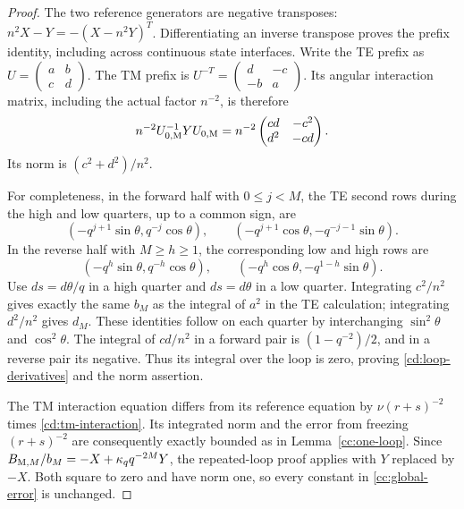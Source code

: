 \begin{proof}
The two reference generators are negative transposes:
$n^2X-Y=-(X-n^2Y)^T$. Differentiating an inverse transpose proves
the prefix identity, including across continuous state interfaces.
Write the TE prefix as
$U=\left(\begin{smallmatrix}a&b\\c&d\end{smallmatrix}\right)$.
The TM prefix is
$U^{-T}=\left(\begin{smallmatrix}d&-c\\-b&a\end{smallmatrix}\right)$.
Its angular interaction matrix, including the actual factor $n^{-2}$,
is therefore
\begin{equation}\label{cd:tm-interaction}
 n^{-2}U_{0,{\rm M}}^{-1}YU_{0,{\rm M}}
   =n^{-2}\begin{pmatrix}cd&-c^2\\d^2&-cd\end{pmatrix}.
\end{equation}
Its norm is $(c^2+d^2)/n^2$.

For completeness, in the forward half with $0\leq j<M$, the TE
second rows during the high and low quarters, up to a common sign, are
\[
 (-q^{j+1}\sin\theta,q^{-j}\cos\theta),\qquad
 (-q^{j+1}\cos\theta,-q^{-j-1}\sin\theta).
\]
In the reverse half with $M\geq h\geq1$, the corresponding low
and high rows are
\[
 (-q^h\sin\theta,q^{-h}\cos\theta),\qquad
 (-q^h\cos\theta,-q^{1-h}\sin\theta).
\]
Use $ds=d\theta/q$ in a high quarter and $ds=d\theta$ in a
low quarter. Integrating $c^2/n^2$ gives exactly the same
$b_M$ as the integral of $a^2$ in the TE calculation; integrating
$d^2/n^2$ gives $d_M$. These identities follow on each quarter
by interchanging $\sin^2\theta$ and $\cos^2\theta$.
The integral of $cd/n^2$ in a forward pair is
$(1-q^{-2})/2$, and in a reverse pair its negative.
Thus its integral over the loop is zero, proving
\eqref{cd:loop-derivatives} and the norm assertion.

The TM interaction equation differs from its reference equation
by $\nu(r+s)^{-2}$ times \eqref{cd:tm-interaction}.
Its integrated norm and the error from freezing $(r+s)^{-2}$
are consequently exactly bounded as in Lemma~\ref{cc:one-loop}.
Since $B_{{\rm M},M}/b_M=-X+\kappa_qq^{-2M}Y$,
the repeated-loop proof applies with $Y$ replaced by $-X$.
Both square to zero and have norm one, so every constant in
\eqref{cc:global-error} is unchanged.
\end{proof}

